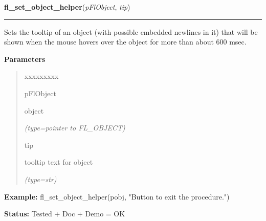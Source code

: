 \hspace{.8\funcindent}\begin{boxedminipage}{\funcwidth}

    \raggedright \textbf{fl\_set\_object\_helper}(\textit{pFlObject}, \textit{tip})

    \vspace{-1.5ex}

    \rule{\textwidth}{0.5\fboxrule}
\setlength{\parskip}{2ex}
    Sets the tooltip of an object (with possible embedded newlines in it) 
    that will be shown when the mouse hovers over the object for more than 
    about 600 msec.

\setlength{\parskip}{1ex}
      \textbf{Parameters}
      \vspace{-1ex}

      \begin{quote}
        \begin{Ventry}{xxxxxxxxx}

          \item[pFlObject]

          object

            {\it (type=pointer to FL\_OBJECT)}

          \item[tip]

          tooltip text for object

            {\it (type=str)}

        \end{Ventry}

      \end{quote}

\textbf{Example:} fl\_set\_object\_helper(pobj, "Button to exit the procedure.")



\textbf{Status:} Tested + Doc + Demo = OK



    \end{boxedminipage}

    \label{xformslib:flbasic:fl_set_object_position}

    \vspace{0.5ex}


